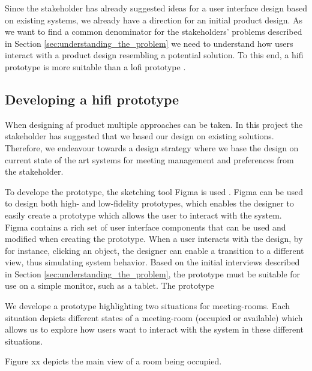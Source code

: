 Since the stakeholder has already suggested ideas for a user interface design based on existing systems, we already have a direction for an initial product design. 
As we want to find a common denominator for the stakeholders' problems described in Section \ref{sec:understanding_the_problem} we need to understand how users interact with a product design resembling a potential solution.
To this end, a hifi prototype is more suitable than a lofi prototype \cite{low-vs-high-fidelity-prototype}.

\subsection{Developing a hifi prototype}
When designing af product multiple approaches can be taken. 
In this project the stakeholder has suggested that we based our design on existing solutions.
Therefore, we endeavour towards a design strategy where we base the design on current state of the art systems for meeting management and preferences from the stakeholder.

To develope the prototype, the sketching tool Figma is used \cite{}.
Figma can be used to design both high- and low-fidelity prototypes, which enables the designer to easily create a prototype which allows the user to interact with the system.
Figma contains a rich set of user interface components that can be used and modified when creating the prototype.
When a user interacts with the design, by for instance, clicking an object, the designer can enable a transition to a different view, thus simulating system behavior.  
Based on the initial interviews described in Section \ref{sec:understanding_the_problem}, the prototype must be suitable for use on a simple monitor, such as a tablet.
The prototype 

We develope a prototype highlighting two situations for meeting-rooms.
Each situation depicts different states of a meeting-room (occupied or available) which allows us to explore how users want to interact with the system in these different situations. 

Figure xx depicts the main view of a room being occupied. 
